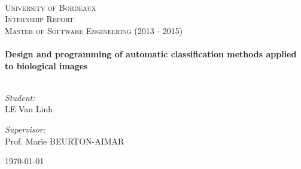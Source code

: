 \begin{titlepage}
\begin{center}
\\[2cm]
\textsc{\LARGE University of Bordeaux} \\[1.5cm]
\textsc{\Large Internship Report}\\[2cm]
\textsc{\Large Master of Software Engineering (2013 - 2015)}\\[1cm]
\HRule
\\[0.3cm]
\huge \bfseries Design and programming of automatic classification methods applied to biological images
\\[0.3cm]
\HRule
\\[2cm]
\noindent 
\begin{minipage}{0.4\textwidth}
\begin{flushleft} \large
\emph{Student:}\\
\textsc{LE} Van Linh 
\end{flushleft}
\end{minipage}%
\begin{minipage}{0.6\textwidth}
\begin{flushright} \large
\emph{Supervisor:} \\
Prof. Marie \textsc{BEURTON-AIMAR} \\
\end{flushright}
\end{minipage}

\vfill
{\large \today}
\end{center}
\end{titlepage}
